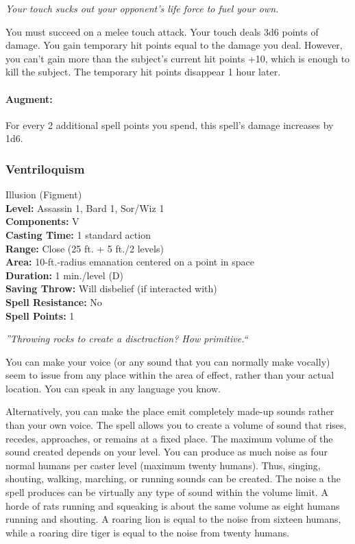 \emph{Your touch sucks out your opponent's life force to fuel your own.}

You must succeed on a melee touch attack. 
Your touch deals 3d6 points of damage. 
You gain temporary hit points equal to the damage you deal. 
However, you can't gain more than the subject's current hit points +10, which is enough to kill the subject. 
The temporary hit points disappear 1 hour later.

\paragraph{Augment:} For every 2 additional spell points you spend, this spell's damage increases by 1d6.

\subsubsection{Ventriloquism}
\label{Spell:Ventriloquism}
Illusion (Figment)
\\ \textbf{Level:} Assassin 1, Bard 1, Sor/Wiz 1
\\ \textbf{Components:} V
\\ \textbf{Casting Time:} 1 standard action
\\ \textbf{Range:} Close (25 ft. + 5 ft./2 levels)
\\ \textbf{Area:} 10-ft.-radius emanation centered on a point in space
\\ \textbf{Duration:} 1 min./level (D)
\\ \textbf{Saving Throw:} Will disbelief (if interacted with)
\\ \textbf{Spell Resistance:} No
\\ \textbf{Spell Points:} 1

\emph{''Throwing rocks to create a disctraction? How primitive.``}

You can make your voice (or any sound that you can normally make vocally) seem to issue from any place within the area of effect, rather than your actual location. 
You can speak in any language you know. 

Alternatively, you can make the place emit completely made-up sounds rather than your own voice.
The spell allows you to create a volume of sound that rises, recedes, approaches, or remains at a fixed place. 
The maximum volume of the sound created depends on your level. 
You can produce as much noise as four normal humans per caster level (maximum twenty humans). 
Thus, singing, shouting, walking, marching, or running sounds can be created. 
The noise a the spell produces can be virtually any type of sound within the volume limit. 
A horde of rats running and squeaking is about the same volume as eight humans running and shouting. 
A roaring lion is equal to the noise from sixteen humans, while a roaring dire tiger is equal to the noise from twenty humans.

